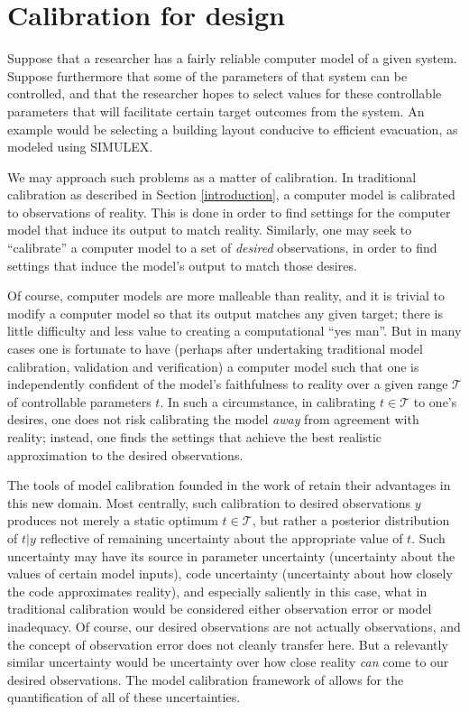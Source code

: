 \documentclass{article}
\begin{document}
\section{Calibration for design}\label{calib_for_design}


Suppose that a researcher has a fairly reliable computer model of a given system. Suppose furthermore that some of the parameters of that system can be controlled, and that the researcher hopes to select values for these controllable parameters that will facilitate certain target outcomes from the system. An example would be selecting a building layout conducive to efficient evacuation, as modeled using SIMULEX.

We may approach such problems as a matter of calibration. In traditional calibration as described in Section \ref{introduction}, a computer model is calibrated to observations of reality. This is done in order to find settings for the computer model that induce its output to match reality. Similarly, one may seek to ``calibrate'' a computer model to a set of \emph{desired} observations, in order to find settings that induce the model's output to match those desires. 

Of course, computer models are more malleable than reality, and it is trivial to modify a computer model so that its output matches any given target; there is little difficulty and less value to creating a computational ``yes man''. But in many cases one is fortunate to have (perhaps after undertaking traditional model calibration, validation and verification) a computer model such that one is independently confident of the model's faithfulness to reality over a given range $\mathcal T$ of controllable parameters $t$. In such a circumstance, in calibrating $t\in\mathcal T$ to one's desires, one does not risk calibrating the model \emph{away} from agreement with reality; instead, one finds the settings that achieve the best realistic approximation to the desired observations.

The tools of model calibration founded in the work of \cite{Kennedy2001} retain their advantages in this new domain. Most centrally, such calibration to desired observations $y$ produces not merely a static optimum $t\in\mathcal T$, but rather a posterior distribution of $t|y$ reflective of remaining uncertainty about the appropriate value of $t$. Such uncertainty may have its source in parameter uncertainty (uncertainty about the values of certain model inputs), code uncertainty (uncertainty about how closely the code approximates reality), and especially saliently in this case, what in traditional calibration would be considered either observation error or model inadequacy. Of course, our desired observations are not actually observations, and the concept of observation error does not cleanly transfer here. But a relevantly similar uncertainty would be uncertainty over how close reality \emph{can} come to our desired observations. The model calibration framework of \cite{Kennedy2001} allows for the quantification of all of these uncertainties.
\end{document}
